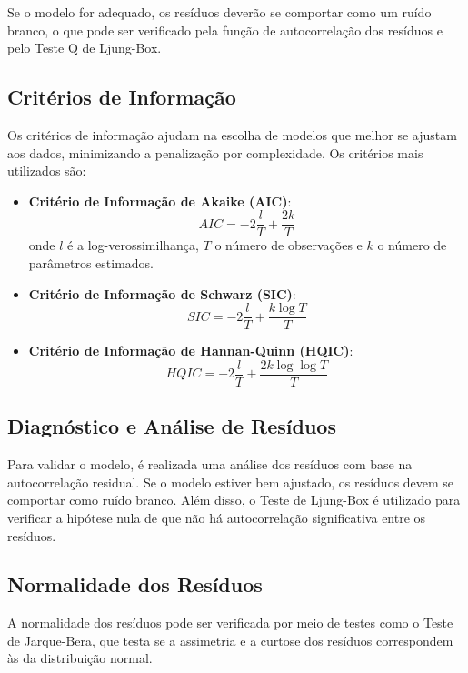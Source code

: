 \documentclass{sciposter}
\begin{document}
\begin{multicols}{3}
Se o modelo for adequado, os resíduos deverão se comportar como um ruído branco, o que pode ser verificado pela função de autocorrelação dos resíduos e pelo Teste Q de Ljung-Box.

\subsection{Critérios de Informação}
Os critérios de informação ajudam na escolha de modelos que melhor se ajustam aos dados, minimizando a penalização por complexidade. Os critérios mais utilizados são:

\begin{itemize}
    \item \textbf{Critério de Informação de Akaike (AIC)}: 
    \[
    AIC = -2 \frac{l}{T} + \frac{2k}{T}
    \]
    onde $l$ é a log-verossimilhança, $T$ o número de observações e $k$ o número de parâmetros estimados.
    
    \item \textbf{Critério de Informação de Schwarz (SIC)}: 
    \[
    SIC = -2 \frac{l}{T} + \frac{k \log T}{T}
    \]
    
    \item \textbf{Critério de Informação de Hannan-Quinn (HQIC)}: 
    \[
    HQIC = -2 \frac{l}{T} + \frac{2k \log \log T}{T}
    \]
\end{itemize}

\subsection{Diagnóstico e Análise de Resíduos}
Para validar o modelo, é realizada uma análise dos resíduos com base na autocorrelação residual. Se o modelo estiver bem ajustado, os resíduos devem se comportar como ruído branco. Além disso, o Teste de Ljung-Box é utilizado para verificar a hipótese nula de que não há autocorrelação significativa entre os resíduos.

\subsection{Normalidade dos Resíduos}
A normalidade dos resíduos pode ser verificada por meio de testes como o Teste de Jarque-Bera, que testa se a assimetria e a curtose dos resíduos correspondem às da distribuição normal.

\end{multicols}
\end{document}
